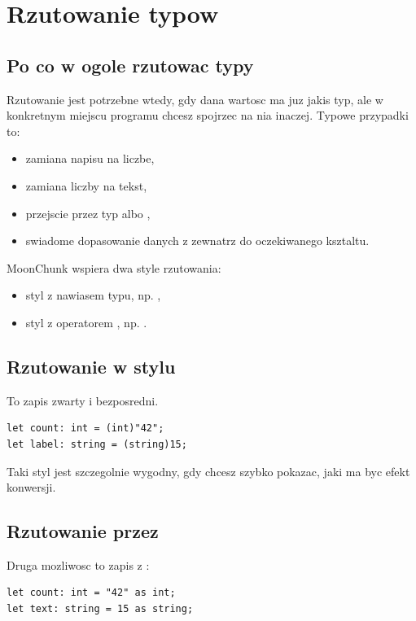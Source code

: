 \chapter{Rzutowanie typow}

\section{Po co w ogole rzutowac typy}
Rzutowanie jest potrzebne wtedy, gdy dana wartosc ma juz jakis typ, ale w konkretnym
miejscu programu chcesz spojrzec na nia inaczej. Typowe przypadki to:

\begin{itemize}
  \item zamiana napisu  na liczbe,
  \item zamiana liczby na tekst,
  \item przejscie przez typ  albo ,
  \item swiadome dopasowanie danych z zewnatrz do oczekiwanego ksztaltu.
\end{itemize}

MoonChunk wspiera dwa style rzutowania:

\begin{itemize}
  \item styl z nawiasem typu, np. ,
  \item styl z operatorem , np. .
\end{itemize}

\section{Rzutowanie w stylu }
To zapis zwarty i bezposredni.

\begin{lstlisting}[style=moonchunk,caption={Rzutowanie w stylu C}]
let count: int = (int)"42";
let label: string = (string)15;
\end{lstlisting}

Taki styl jest szczegolnie wygodny, gdy chcesz szybko pokazac, jaki ma byc efekt
konwersji.

\section{Rzutowanie przez }
Druga mozliwosc to zapis z :

\begin{lstlisting}[style=moonchunk,caption={Rzutowanie przez as}]
let count: int = "42" as int;
let text: string = 15 as string;
\end{lstlisting}

